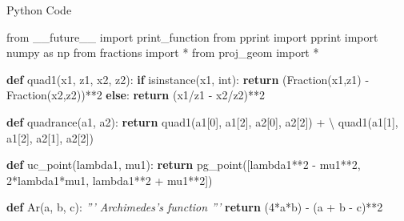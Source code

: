 \documentclass[10pt,ignorenonframetext,serif,onlymath]{beamer}
\newenvironment{Shaded}{}{}
\newcommand{\BuiltInTok}[1]{#1}
\newcommand{\CommentTok}[1]{\textcolor[rgb]{0.38,0.63,0.69}{\textit{#1}}}
\newcommand{\ControlFlowTok}[1]{\textcolor[rgb]{0.00,0.44,0.13}{\textbf{#1}}}
\newcommand{\DecValTok}[1]{\textcolor[rgb]{0.25,0.63,0.44}{#1}}
\newcommand{\ImportTok}[1]{#1}
\newcommand{\KeywordTok}[1]{\textcolor[rgb]{0.00,0.44,0.13}{\textbf{#1}}}
\newcommand{\NormalTok}[1]{#1}
\newcommand{\OperatorTok}[1]{\textcolor[rgb]{0.40,0.40,0.40}{#1}}
\begin{document}
\begin{frame}[fragile]{Python Code}
\protect\hypertarget{sec:python-code}{}

\scriptsize

\begin{Shaded}
\begin{Highlighting}[]
\ImportTok{from}\NormalTok{ __future__ }\ImportTok{import}\NormalTok{ print_function}
\ImportTok{from}\NormalTok{ pprint }\ImportTok{import}\NormalTok{ pprint}
\ImportTok{import}\NormalTok{ numpy }\ImportTok{as}\NormalTok{ np}
\ImportTok{from}\NormalTok{ fractions }\ImportTok{import} \OperatorTok{*}
\ImportTok{from}\NormalTok{ proj_geom }\ImportTok{import} \OperatorTok{*}

\KeywordTok{def}\NormalTok{ quad1(x1, z1, x2, z2):}
    \ControlFlowTok{if} \BuiltInTok{isinstance}\NormalTok{(x1, }\BuiltInTok{int}\NormalTok{):}
        \ControlFlowTok{return}\NormalTok{ (Fraction(x1,z1) }\OperatorTok{-}\NormalTok{ Fraction(x2,z2))}\OperatorTok{**}\DecValTok{2}
    \ControlFlowTok{else}\NormalTok{:}
        \ControlFlowTok{return}\NormalTok{ (x1}\OperatorTok{/}\NormalTok{z1 }\OperatorTok{-}\NormalTok{ x2}\OperatorTok{/}\NormalTok{z2)}\OperatorTok{**}\DecValTok{2}

\KeywordTok{def}\NormalTok{ quadrance(a1, a2):}
    \ControlFlowTok{return}\NormalTok{ quad1(a1[}\DecValTok{0}\NormalTok{], a1[}\DecValTok{2}\NormalTok{], a2[}\DecValTok{0}\NormalTok{], a2[}\DecValTok{2}\NormalTok{]) }\OperatorTok{+} \OperatorTok{\textbackslash{}}
\NormalTok{            quad1(a1[}\DecValTok{1}\NormalTok{], a1[}\DecValTok{2}\NormalTok{], a2[}\DecValTok{1}\NormalTok{], a2[}\DecValTok{2}\NormalTok{])}

\KeywordTok{def}\NormalTok{ uc_point(lambda1, mu1):}
    \ControlFlowTok{return}\NormalTok{ pg_point([lambda1}\OperatorTok{**}\DecValTok{2} \OperatorTok{-}\NormalTok{ mu1}\OperatorTok{**}\DecValTok{2}\NormalTok{,}
                \DecValTok{2}\OperatorTok{*}\NormalTok{lambda1}\OperatorTok{*}\NormalTok{mu1, lambda1}\OperatorTok{**}\DecValTok{2} \OperatorTok{+}\NormalTok{ mu1}\OperatorTok{**}\DecValTok{2}\NormalTok{])}

\KeywordTok{def}\NormalTok{ Ar(a, b, c):}
    \CommentTok{''' Archimedes's function '''}
    \ControlFlowTok{return}\NormalTok{ (}\DecValTok{4}\OperatorTok{*}\NormalTok{a}\OperatorTok{*}\NormalTok{b) }\OperatorTok{-}\NormalTok{ (a }\OperatorTok{+}\NormalTok{ b }\OperatorTok{-}\NormalTok{ c)}\OperatorTok{**}\DecValTok{2}
\end{Highlighting}
\end{Shaded}

\end{frame}
\end{document}
